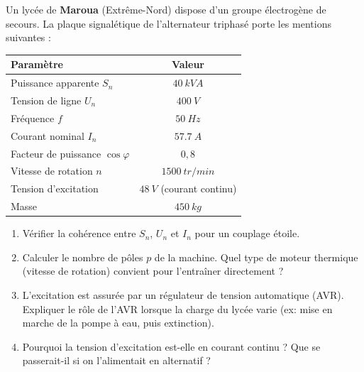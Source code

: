 \documentclass[11pt]{article}
\begin{document}
\begin{exercice}
Un lycée de \textbf{Maroua} (Extrême-Nord) dispose d'un groupe électrogène de secours. La plaque signalétique de l'alternateur triphasé porte les mentions suivantes :
\begin{center}
\begin{tabular}{|l|c|}
\hline
\textbf{Paramètre} & \textbf{Valeur} \\ \hline
Puissance apparente $S_n$ & $\SI{40}{kVA}$ \\ \hline
Tension de ligne $U_n$ & $\SI{400}{V}$ \\ \hline
Fréquence $f$ & $\SI{50}{Hz}$ \\ \hline
Courant nominal $I_n$ & $\SI{57.7}{A}$ \\ \hline
Facteur de puissance $\cos\varphi$ & $0,8$ \\ \hline
Vitesse de rotation $n$ & $\SI{1500}{tr/min}$ \\ \hline
Tension d'excitation & $\SI{48}{V}$ (courant continu) \\ \hline
Masse & $\SI{450}{kg}$ \\ \hline
\end{tabular}
\end{center}

\begin{enumerate}
    \item Vérifier la cohérence entre $S_n$, $U_n$ et $I_n$ pour un couplage étoile.
    \item Calculer le nombre de pôles $p$ de la machine. Quel type de moteur thermique (vitesse de rotation) convient pour l'entraîner directement ?
    \item L'excitation est assurée par un régulateur de tension automatique (AVR). Expliquer le rôle de l'AVR lorsque la charge du lycée varie (ex: mise en marche de la pompe à eau, puis extinction).
    \item Pourquoi la tension d'excitation est-elle en courant continu ? Que se passerait-il si on l'alimentait en alternatif ?
\end{enumerate}
\end{exercice}
\end{document}

